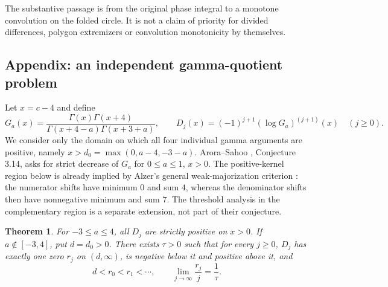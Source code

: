 \documentclass[11pt,a4paper]{article}
\numberwithin{equation}{section}
\newtheorem{theorem}{Theorem}[section]
\theoremstyle{definition}
\theoremstyle{remark}
\begin{document}
The substantive passage is from the original phase integral to a monotone convolution on the folded circle. It is not a claim of priority for divided differences, polygon extremizers or convolution monotonicity by themselves.

\subsection*{Appendix: an independent gamma-quotient problem}
Let $x=c-4$ and define
\[
 G_a(x)=\frac{\Gamma(x)\Gamma(x+4)}
 {\Gamma(x+4-a)\Gamma(x+3+a)},\qquad
 D_j(x)=(-1)^{j+1}(\log G_a)^{(j+1)}(x)\quad(j\ge0).
\]
We consider only the domain on which all four individual gamma arguments are positive, namely $x>d_0=\max(0,a-4,-3-a)$. Arora--Sahoo \cite{r31heisei:AS}, Conjecture 3.14, asks for strict decrease of $G_a$ for $0\le a\le1$, $x>0$. The positive-kernel region below is already implied by Alzer's general weak-majorization criterion \cite{r31heisei:Alzer}: the numerator shifts have minimum $0$ and sum $4$, whereas the denominator shifts then have nonnegative minimum and sum $7$. The threshold analysis in the complementary region is a separate extension, not part of their conjecture.
\begin{theorem}\label{r31heisei:gamma}
For $-3\le a\le4$, all $D_j$ are strictly positive on $x>0$. If $a\notin[-3,4]$, put $d=d_0>0$. There exists $\tau>0$ such that for every $j\ge0$, $D_j$ has exactly one zero $r_j$ on $(d,\infty)$, is negative below it and positive above it, and
\[
 d<r_0<r_1<\cdots,\qquad \lim_{j\to\infty}\frac{r_j}{j}=\frac1\tau.
\]
\end{theorem}
\end{document}
